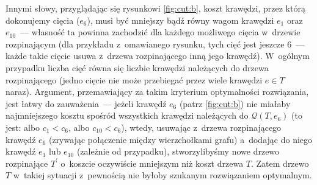 Innymi słowy, przyglądając się rysunkowi \ref{fig:cut:b}, koszt krawędzi, przez którą dokonujemy cięcia ($e_{6}$), musi być mniejszy bądź równy wagom krawędzi $e_{1}$ oraz $e_{10}$~--- własność ta powinna zachodzić dla każdego możliwego cięcia w~drzewie rozpinającym (dla przykładu z~omawianego rysunku, tych cięć jest jeszcze $6$~--- każde takie cięcie usuwa z~drzewa rozpinającego inną jego krawędź).
W~ogólnym przypadku liczba cięć równa się liczbie krawędzi należących do drzewa rozpinającego (jedno cięcie nie może przebiegać przez wiele krawędzi $e \in T$ naraz).
Argument, przemawiający za takim kryterium optymalności rozwiązania, jest łatwy do zauważenia~--- jeżeli krawędź $e_{6}$ (patrz \ref{fig:cut:b}) nie miałaby najmniejszego kosztu spośród wszystkich krawędzi należących do $\mathcal{Q} \left( T, e_{6} \right)$ (to jest: albo $c_{1} < c_{6}$, albo $c_{10} < c_{6}$), wtedy, usuwając z~drzewa rozpinającego krawędź $e_{6}$ (zrywając połączenie między wierzchołkami grafu) a~dodając do niego krawędź $e_{1}$ lub $e_{10}$ (zależnie od przypadku), stworzylibyśmy nowe drzewo rozpinające $T^{\prime}$ o~koszcie oczywiście mniejszym niż koszt drzewa $T$.
Zatem drzewo $T$ w~takiej sytuacji z~pewnością nie byłoby szukanym rozwiązaniem optymalnym.
\\
